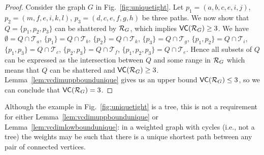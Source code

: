 \begin{proof}
  Consider the graph $G$ in Fig.~\ref{fig:uniquetight}.
  Let $p_1=(a,b,c,e,i,j)$, $p_2=(m,f,e,i,k,l)$, $p_3=(d,c,e,f,g,h)$ be three
  paths. We now show that $Q=\{p_1,p_2,p_3\}$ can be shattered by $\mathcal{R}_G$, which
  implies $\mathsf{VC}(\mathcal{R}_G)\ge 3$. We have $\emptyset=Q\cap\mathcal{T}_a$,
  $\{p_1\}=Q\cap\mathcal{T}_b$, $\{p_2\}=Q\cap\mathcal{T}_k$,
  $\{p_3\}=Q\cap\mathcal{T}_g$, $\{p_1,p_2\}=Q\cap\mathcal{T}_i$,
  $\{p_1,p_3\}=Q\cap\mathcal{T}_c$, $\{p_2,p_3\}=Q\cap\mathcal{T}_f$,
  $\{p_1,p_2,p_3\}=Q\cap\mathcal{T}_e$.  
  Hence all subsets of $Q$ can be expressed as the intersection between $Q$ and
  some range in $\mathcal{R}_G$ which means that $Q$ can be shattered and
  $\mathsf{VC}(\mathcal{R}_G)\ge 3$. Lemma~\ref{lem:vcdimuppboundunique} gives us an upper
  bound $\mathsf{VC}(\mathcal{R}_G)\le3$, so we can conclude that $\mathsf{VC}(\mathcal{R}_G)=3$.
\end{proof}

Although the example in Fig.~\ref{fig:uniquetight} is a tree, this is not a
requirement for either Lemma~\ref{lem:vcdimuppboundunique} or
Lemma~\ref{lem:vcdimlowboundunique}: in a weighted graph with cycles (i.e., not
a tree) the weights may be such that there is a unique shortest path between any
pair of connected vertices.
\fi

